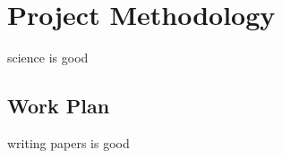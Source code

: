\chapter{Project Methodology}
\label{ch04:methodology}

science is good

\section{Work Plan}
\label{sec:work-plan}

writing papers is good 

